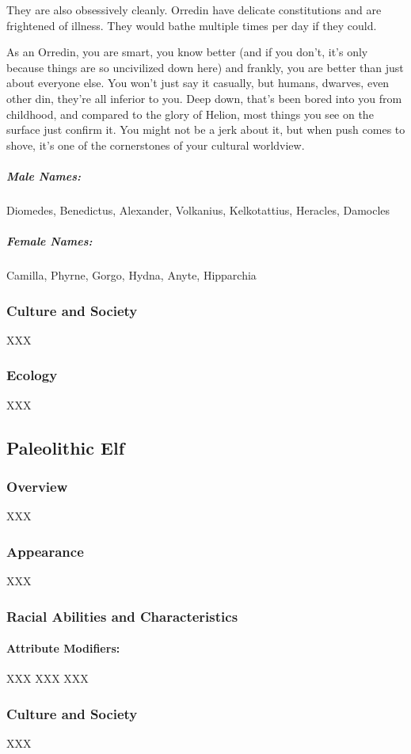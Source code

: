 \documentclass[oneside,11pt,english]{book}
\begin{document}
They are also obsessively cleanly. Orredin have delicate constitutions and are frightened of illness. They 
would bathe multiple times per day if they could. 

As an Orredin, you are smart, you know better (and if you don’t, it’s only because things are so 
uncivilized down here) and frankly, you are better than just about everyone else. You won’t just say it 
casually, but humans, dwarves, even other din, they’re all inferior to you. Deep down, that’s been bored 
into you from childhood, and compared to the glory of Helion, most things you see on the surface just 
confirm it. You might not be a jerk about it, but when push comes to shove, it’s one of the cornerstones of 
your cultural worldview. 

\subparagraph{Male Names:} Diomedes, Benedictus, Alexander, Volkanius, Kelkotattius, Heracles, Damocles 
\subparagraph{Female Names:} Camilla, Phyrne, Gorgo, Hydna, Anyte, Hipparchia 

\subsubsection*{Culture and Society} 
XXX 
\subsubsection*{Ecology} 
XXX 
\subsection{Paleolithic Elf}
\subsubsection*{Overview} 
XXX 
\subsubsection*{Appearance} 
XXX 
\subsubsection*{Racial Abilities and Characteristics} 
\paragraph{Attribute Modifiers:} XXX 
XXX 
XXX 
\subsubsection*{Culture and Society} 
XXX 
\end{document}
